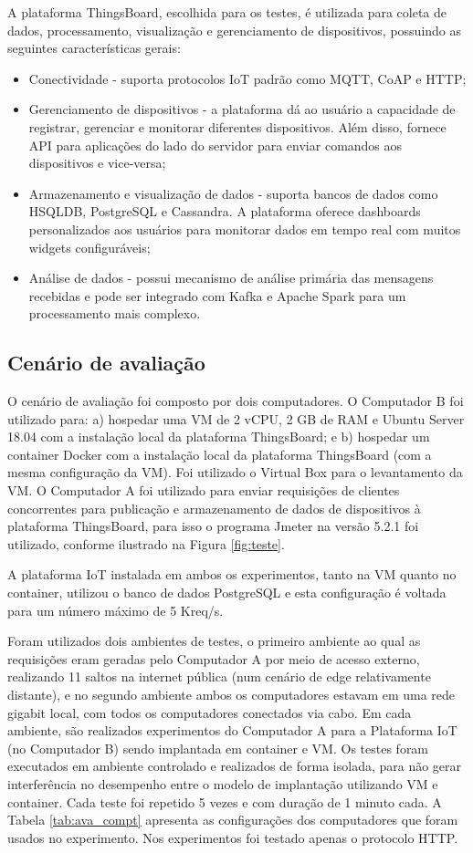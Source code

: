 \documentclass{sbrt}
\begin{document}
A plataforma ThingsBoard, escolhida para os testes, é utilizada para coleta de dados, processamento, visualização e gerenciamento de dispositivos, possuindo as seguintes características gerais:
\begin{itemize}
    \item Conectividade - suporta protocolos IoT padrão como MQTT, CoAP e HTTP;
    \item Gerenciamento de dispositivos - a plataforma dá ao usuário a capacidade de registrar, gerenciar e monitorar diferentes dispositivos. Além disso, fornece API para aplicações do lado do servidor para enviar comandos aos dispositivos e vice-versa;
    \item Armazenamento e visualização de dados - suporta bancos de dados como HSQLDB, PostgreSQL e Cassandra. A plataforma oferece dashboards personalizados aos usuários para monitorar dados em tempo real com muitos widgets configuráveis;
    \item Análise de dados - possui mecanismo de análise primária das mensagens recebidas e pode ser integrado com Kafka e Apache Spark para um processamento mais complexo.
\end{itemize}

\subsection{Cenário de avaliação}

O cenário de avaliação foi composto por dois computadores. O Computador B foi utilizado para: a) hospedar uma VM de 2 vCPU, 2 GB de RAM e Ubuntu Server 18.04 com a instalação local da plataforma ThingsBoard; e b) hospedar um container Docker com a instalação local da plataforma ThingsBoard (com a mesma configuração da VM). Foi utilizado o Virtual Box para o levantamento da VM. O Computador A foi utilizado para enviar requisições de clientes concorrentes para publicação e armazenamento de dados de dispositivos à plataforma ThingsBoard, para isso o programa Jmeter na versão 5.2.1 foi utilizado, conforme ilustrado na Figura \ref{fig:teste}.

A plataforma IoT instalada em ambos os experimentos, tanto na VM quanto no container, utilizou o banco de dados PostgreSQL e esta configuração é voltada para um número máximo de 5 Kreq/s.

Foram utilizados dois ambientes de testes, o primeiro ambiente ao qual as requisições eram geradas pelo Computador A por meio de acesso externo, realizando 11 saltos na internet pública (num cenário de edge relativamente distante), e no segundo ambiente ambos os computadores estavam em uma rede gigabit local, com todos os computadores conectados via cabo. Em cada ambiente, são realizados experimentos do Computador A para a Plataforma IoT (no Computador B) sendo implantada em container e VM. Os testes foram executados em ambiente controlado e realizados de forma isolada, para não gerar interferência no desempenho entre o modelo de implantação utilizando VM e container. Cada teste foi repetido 5 vezes e com duração de 1 minuto cada. A Tabela \ref{tab:ava_compt} apresenta as configurações dos computadores que foram usados no experimento. Nos experimentos foi testado apenas o protocolo HTTP.
\end{document}
